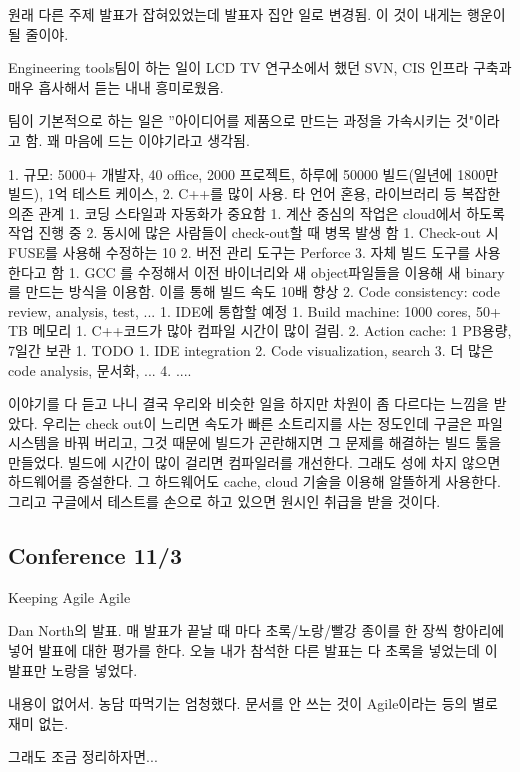 \documentclass[a4paper]{article}
\begin{document}
원래 다른 주제 발표가 잡혀있었는데 발표자 집안 일로 변경됨. 이 것이 내게는 행운이 될 줄이야.
 
Engineering tools팀이 하는 일이 LCD TV 연구소에서 했던 SVN, CIS 인프라 구축과 매우 흡사해서 듣는 내내 흥미로웠음.
 
팀이 기본적으로 하는 일은 ”아이디어를 제품으로 만드는 과정을 가속시키는 것"이라고 함. 꽤 마음에 드는 이야기라고 생각됨.
 
1. 규모: 5000+ 개발자, 40 office, 2000 프로젝트, 하루에 50000 빌드(일년에 1800만 빌드), 1억  테스트 케이스,  
2. C++를 많이 사용. 타 언어 혼용, 라이브러리 등 복잡한 의존 관계
1. 코딩 스타일과 자동화가 중요함
1. 계산 중심의 작업은 cloud에서 하도록 작업 진행 중
2. 동시에 많은 사람들이 check-out할 때 병목 발생 함
1. Check-out 시 FUSE를 사용해 수정하는 10%
2. 버전 관리 도구는 Perforce
3. 자체 빌드 도구를 사용한다고 함
1. GCC 를 수정해서  이전 바이너리와 새 object파일들을 이용해 새 binary를 만드는 방식을 이용함. 이를 통해 빌드 속도 10배 향상
2. Code consistency: code review, analysis, test, ...
1. IDE에 통합할 예정
1. Build machine: 1000 cores, 50+ TB 메모리
1. C++코드가 많아 컴파일 시간이 많이 걸림.
2. Action cache: 1 PB용량, 7일간 보관
1. TODO
1. IDE integration 
2. Code  visualization, search
3. 더 많은 code analysis, 문서화, ...
4. .... 
 
이야기를 다 듣고 나니 결국 우리와 비슷한 일을 하지만 차원이 좀 다르다는 느낌을 받았다. 우리는 check out이 느리면 속도가 빠른 소트리지를 사는 정도인데 구글은 파일시스템을 바꿔 버리고, 그것 때문에  빌드가 곤란해지면 그 문제를 해결하는 빌드 툴을 만들었다. 빌드에 시간이 많이 걸리면 컴파일러를 개선한다. 그래도 성에 차지 않으면 하드웨어를 증설한다. 그 하드웨어도 cache, cloud 기술을 이용해 알뜰하게 사용한다. 그리고  구글에서 테스트를 손으로 하고 있으면 원시인 취급을 받을 것이다.

\subsection{Conference 11/3}Keeping Agile Agile
 
Dan North의 발표. 
매 발표가 끝날 때 마다 초록/노랑/빨강 종이를 한 장씩 항아리에 넣어 발표에 대한 평가를 한다.
오늘 내가 참석한 다른 발표는 다 초록을 넣었는데 이 발표만 노랑을 넣었다.
 
내용이 없어서. 농담 따먹기는 엄청했다. 문서를 안 쓰는 것이 Agile이라는 등의 별로 재미 없는.
 
그래도 조금 정리하자면...
 
\end{document}
